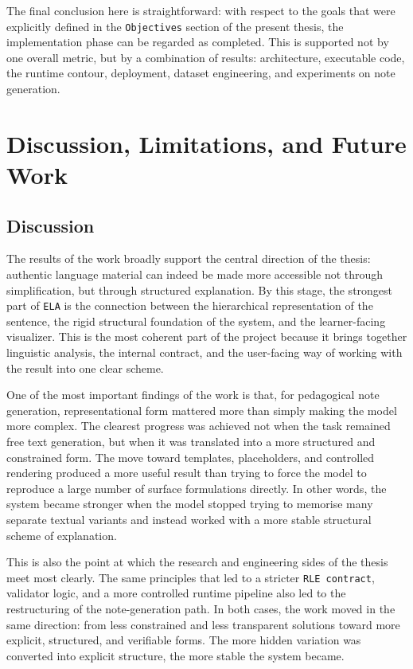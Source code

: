 \documentclass[12pt,a4paper,oneside]{report}
\begin{document}
The final conclusion here is straightforward: with respect to the goals that were explicitly defined in the \texttt{Objectives} section of the present thesis, the implementation phase can be regarded as completed. This is supported not by one overall metric, but by a combination of results: architecture, executable code, the runtime contour, deployment, dataset engineering, and experiments on note generation.

\chapter{Discussion, Limitations, and Future Work}
\section{Discussion}
The results of the work broadly support the central direction of the thesis: authentic language material can indeed be made more accessible not through simplification, but through structured explanation. By this stage, the strongest part of \texttt{ELA} is the connection between the hierarchical representation of the sentence, the rigid structural foundation of the system, and the learner-facing visualizer. This is the most coherent part of the project because it brings together linguistic analysis, the internal contract, and the user-facing way of working with the result into one clear scheme.

One of the most important findings of the work is that, for pedagogical note generation, representational form mattered more than simply making the model more complex. The clearest progress was achieved not when the task remained free text generation, but when it was translated into a more structured and constrained form. The move toward templates, placeholders, and controlled rendering produced a more useful result than trying to force the model to reproduce a large number of surface formulations directly. In other words, the system became stronger when the model stopped trying to memorise many separate textual variants and instead worked with a more stable structural scheme of explanation.

This is also the point at which the research and engineering sides of the thesis meet most clearly. The same principles that led to a stricter \texttt{RLE contract}, validator logic, and a more controlled runtime pipeline also led to the restructuring of the note-generation path. In both cases, the work moved in the same direction: from less constrained and less transparent solutions toward more explicit, structured, and verifiable forms. The more hidden variation was converted into explicit structure, the more stable the system became.
\end{document}
